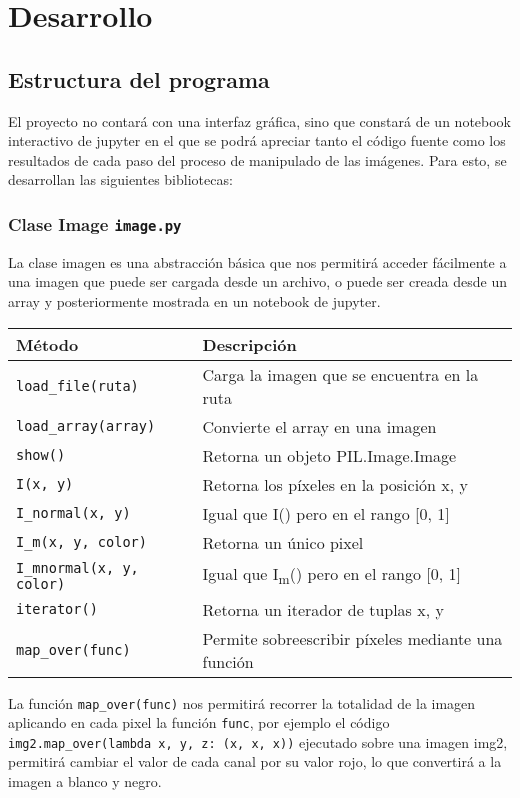 \documentclass[letter]{article}
\begin{document}
\section{Desarrollo}
\label{sec:orgb546ddb}
\subsection{Estructura del programa}
\label{sec:org4c1a1e4}
El proyecto no contará con una interfaz gráfica, sino que constará de un
notebook interactivo de jupyter en el que se podrá apreciar tanto el código
fuente como los resultados de cada paso del proceso de manipulado de las
imágenes. Para esto, se desarrollan las siguientes bibliotecas:

\subsubsection{Clase Image \texttt{image.py}}
\label{sec:orgda60dce}
La clase imagen es una abstracción básica que nos permitirá acceder fácilmente a
una imagen que puede ser cargada desde un archivo, o puede ser creada desde un
array y posteriormente mostrada en un notebook de jupyter.

\begin{center}
\begin{tabular}{ll}
Método & Descripción\\
\hline
\texttt{load\_file(ruta)} & Carga la imagen que se encuentra en la ruta\\
\texttt{load\_array(array)} & Convierte el array en una imagen\\
\texttt{show()} & Retorna un objeto PIL.Image.Image\\
\texttt{I(x, y)} & Retorna los píxeles en la posición x, y\\
\texttt{I\_normal(x, y)} & Igual que I() pero en el rango [0, 1]\\
\texttt{I\_m(x, y, color)} & Retorna un único pixel\\
\texttt{I\_mnormal(x, y, color)} & Igual que I\textsubscript{m}() pero en el rango [0, 1]\\
\texttt{iterator()} & Retorna un iterador de tuplas x, y\\
\texttt{map\_over(func)} & Permite sobreescribir píxeles mediante una función\\
\end{tabular}
\end{center}

La función \texttt{map\_over(func)} nos permitirá recorrer la totalidad de la imagen
aplicando en cada pixel la función \texttt{func}, por ejemplo el código
\texttt{img2.map\_over(lambda x, y, z: (x, x, x))} ejecutado sobre una imagen img2,
permitirá cambiar el valor de cada canal por su valor rojo, lo que convertirá a
la imagen a blanco y negro.
\end{document}
